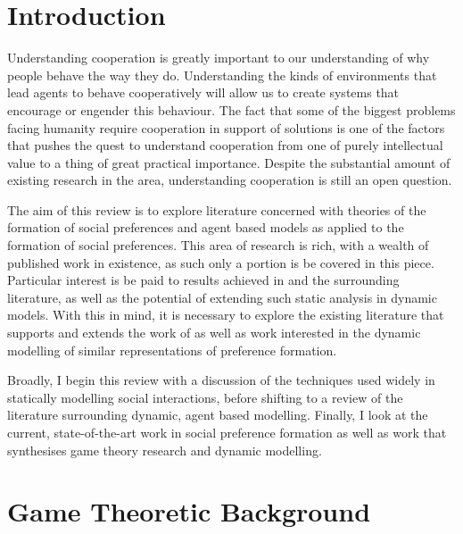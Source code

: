 \documentclass[11pt]{article}
\newcommand*{\np}{\par\noindent\newline}
\begin{document}
\newpage
\tableofcontents
\newpage
\section{Introduction}\label{intro}
Understanding cooperation is greatly important to our understanding of why people behave the way they do.
Understanding the kinds of environments that lead agents to behave cooperatively will allow us to create systems that
encourage or engender this behaviour. The fact that some of the biggest problems facing humanity require cooperation in
support of solutions is one of the factors that pushes the quest to understand cooperation from one of purely
intellectual value to a thing of great practical importance. Despite the substantial amount of existing research in the area, understanding cooperation is still an open question.

\np The aim of this review is to explore literature concerned with theories of the formation of social preferences and
agent based models as applied to the formation of social preferences. This area of research is rich, with a wealth of
published work in existence, as such only a portion is be covered in this piece. Particular interest is be paid to
results achieved in \citet{alger_homo_2013} and the surrounding literature, as well as the potential of extending such
static analysis in dynamic models. With this in mind, it is necessary to explore the existing literature that supports
and extends the work of \citet{alger_homo_2013} as well as work interested in the dynamic modelling of similar
representations of preference formation.

\np Broadly, I begin this review with a discussion of the techniques used widely in statically modelling social interactions, before shifting to a review of the literature surrounding dynamic, agent based modelling.
Finally, I look at the current, state-of-the-art work in social preference formation as well as work that
synthesises game theory research and dynamic modelling.


\section{Game Theoretic Background}\label{social}
\end{document}
